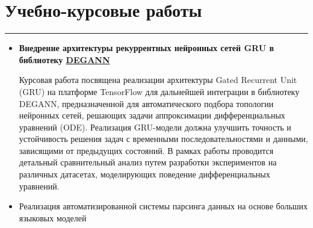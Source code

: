 \documentclass[a4paper,14pt]{article}
\begin{document}
\section*{Учебно-курсовые работы}
\hrule
\vspace{0.5em}
\begin{itemize}
\item \textbf{Внедрение архитектуры рекуррентных нейронных сетей GRU в библиотеку \href{https://github.com/Krekep/degann}{DEGANN}}

Курсовая работа посвящена реализации архитектуры Gated Recurrent Unit (GRU) на платформе TensorFlow для дальнейшей интеграции в библиотеку DEGANN, предназначенной для автоматического подбора топологии нейронных сетей, решающих задачи аппроксимации дифференциальных уравнений (ODE). Реализация GRU-модели должна улучшить точность и устойчивость решения задач с временными последовательностями и данными, зависящими от предыдущих состояний. В рамках работы проводится детальный сравнительный анализ путем разработки экспериментов на различных датасетах, моделирующих поведение дифференциальных уравнений.

\item Реализация автоматизированной системы парсинга данных на основе больших языковых моделей

\end{itemize}
\end{document}

